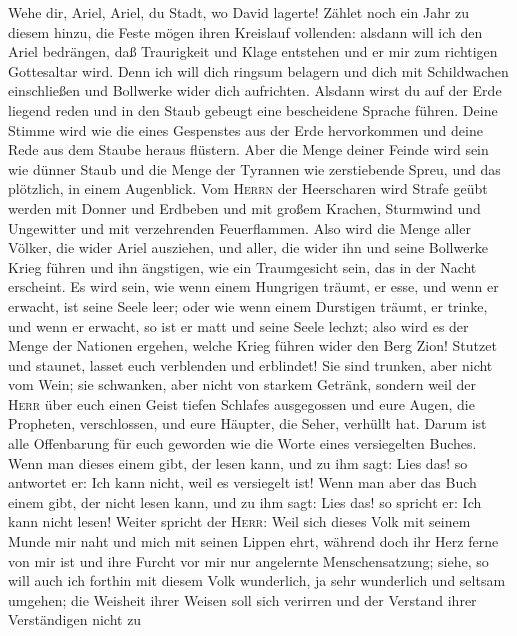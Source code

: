  Wehe dir, Ariel, Ariel, du Stadt, wo David lagerte!
Zählet noch ein Jahr zu diesem hinzu, die Feste mögen ihren Kreislauf
vollenden:  alsdann will ich den Ariel bedrängen, daß
Traurigkeit und Klage entstehen und er mir zum richtigen Gottesaltar
wird.  Denn ich will dich ringsum belagern und dich mit
Schildwachen einschließen und Bollwerke wider dich aufrichten.
 Alsdann wirst du auf der Erde liegend reden und in den
Staub gebeugt eine bescheidene Sprache führen. Deine Stimme wird wie die
eines Gespenstes aus der Erde hervorkommen und deine Rede aus dem Staube
heraus flüstern.  Aber die Menge deiner Feinde wird sein
wie dünner Staub und die Menge der Tyrannen wie zerstiebende Spreu, und
das plötzlich, in einem Augenblick.  Vom \textsc{Herrn}
der Heerscharen wird Strafe geübt werden mit Donner und Erdbeben und mit
großem Krachen, Sturmwind und Ungewitter und mit verzehrenden
Feuerflammen.  Also wird die Menge aller Völker, die wider
Ariel ausziehen, und aller, die wider ihn und seine Bollwerke Krieg
führen und ihn ängstigen, wie ein Traumgesicht sein, das in der Nacht
erscheint.  Es wird sein, wie wenn einem Hungrigen träumt,
er esse, und wenn er erwacht, ist seine Seele leer; oder wie wenn einem
Durstigen träumt, er trinke, und wenn er erwacht, so ist er matt und
seine Seele lechzt; also wird es der Menge der Nationen ergehen, welche
Krieg führen wider den Berg Zion!  Stutzet und staunet,
lasset euch verblenden und erblindet! Sie sind trunken, aber nicht vom
Wein; sie schwanken, aber nicht von starkem Getränk, 
sondern weil der \textsc{Herr} über euch einen Geist tiefen Schlafes
ausgegossen und eure Augen, die Propheten, verschlossen, und eure
Häupter, die Seher, verhüllt hat.  Darum ist alle
Offenbarung für euch geworden wie die Worte eines versiegelten Buches.
Wenn man dieses einem gibt, der lesen kann, und zu ihm sagt: Lies das!
so antwortet er: Ich kann nicht, weil es versiegelt ist! 
Wenn man aber das Buch einem gibt, der nicht lesen kann, und zu ihm
sagt: Lies das! so spricht er: Ich kann nicht lesen! 
Weiter spricht der \textsc{Herr}: Weil sich dieses Volk mit seinem Munde
mir naht und mich mit seinen Lippen ehrt, während doch ihr Herz ferne
von mir ist und ihre Furcht vor mir nur angelernte Menschensatzung;
 siehe, so will auch ich forthin mit diesem Volk
wunderlich, ja sehr wunderlich und seltsam umgehen; die Weisheit ihrer
Weisen soll sich verirren und der Verstand ihrer Verständigen nicht zu
